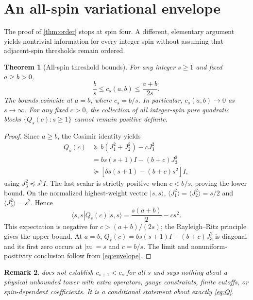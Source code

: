 \documentclass[11pt,a4paper]{article}
\newtheorem{theorem}{Theorem}[section]
\newtheorem{remark}[theorem]{Remark}
\begin{document}
\section{An all-spin variational envelope}\label{sec:allspin}
The proof of \cref{thm:order} stops at spin four. A different,
elementary argument yields nontrivial information for every
integer spin without assuming that adjacent-spin thresholds
remain ordered.

\begin{theorem}[All-spin threshold bounds]\label{thm:bounds}
For any integer $s\geq1$ and fixed $a\geq b>0$,
\begin{equation}\label{eq:envelope}
\boxed{\frac b s\leq c_s(a,b)\leq\frac{a+b}{2s}.}
\end{equation}
The bounds coincide at $a=b$, where $c_s=b/s$.
In particular, $c_s(a,b)\to0$ as $s\to\infty$.
For any fixed $c>0$, the collection of all integer-spin
pure quadratic blocks $\{Q_s(c):s\geq1\}$ cannot remain
positive definite.
\end{theorem}
\begin{proof}
Since $a\geq b$, the Casimir identity yields
\begin{align*}
Q_s(c)&\succeq b(J_1^2+J_2^2)-cJ_3^2\\
&=bs(s+1)I-(b+c)J_3^2\\
&\succeq [bs(s+1)-(b+c)s^2]I,
\end{align*}
using $J_3^2\preceq s^2I$. The last scalar is strictly
positive when $c<b/s$, proving the lower bound.
On the normalized highest-weight vector $|s,s\rangle$,
$\langle J_1^2\rangle=\langle J_2^2\rangle=s/2$ and
$\langle J_3^2\rangle=s^2$. Hence
\[
\langle s,s|Q_s(c)|s,s\rangle
=\frac{s(a+b)}2-cs^2.
\]
This expectation is negative for $c>(a+b)/(2s)$; the
Rayleigh--Ritz principle gives the upper bound. At $a=b$,
$Q_s(c)=bs(s+1)I-(b+c)J_3^2$ is diagonal and its
first zero occurs at $|m|=s$ and $c=b/s$.
The limit and nonuniform-positivity conclusion follow from
\eqref{eq:envelope}.
\end{proof}

\begin{remark}
 does \emph{not} establish
$c_{s+1}<c_s$ for all $s$ and says nothing about a physical
unbounded tower with extra operators, gauge constraints,
finite cutoffs, or spin-dependent coefficients. It is a
conditional statement about exactly \eqref{eq:Q}.
\end{remark}
\end{document}
